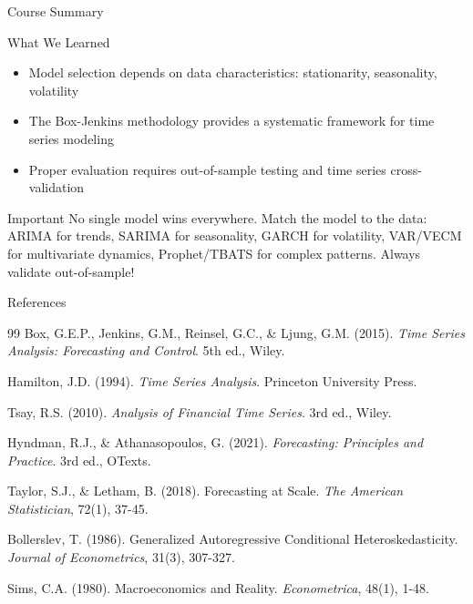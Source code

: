 \documentclass[9pt, aspectratio=169, t]{beamer}
\begin{document}
\begin{frame}{Course Summary}
\begin{block}{What We Learned}
\begin{itemize}
    \item Model selection depends on data characteristics: stationarity, seasonality, volatility
    \item The Box-Jenkins methodology provides a systematic framework for time series modeling
    \item Proper evaluation requires out-of-sample testing and time series cross-validation
\end{itemize}
\end{block}

\begin{alertblock}{Important}
No single model wins everywhere. Match the model to the data: ARIMA for trends, SARIMA for seasonality, GARCH for volatility, VAR/VECM for multivariate dynamics, Prophet/TBATS for complex patterns. Always validate out-of-sample!
\end{alertblock}
\end{frame}

\begin{frame}{References}
    \footnotesize
    \begin{thebibliography}{99}
         Box, G.E.P., Jenkins, G.M., Reinsel, G.C., \& Ljung, G.M. (2015). \textit{Time Series Analysis: Forecasting and Control}. 5th ed., Wiley.

         Hamilton, J.D. (1994). \textit{Time Series Analysis}. Princeton University Press.

         Tsay, R.S. (2010). \textit{Analysis of Financial Time Series}. 3rd ed., Wiley.

         Hyndman, R.J., \& Athanasopoulos, G. (2021). \textit{Forecasting: Principles and Practice}. 3rd ed., OTexts.

         Taylor, S.J., \& Letham, B. (2018). Forecasting at Scale. \textit{The American Statistician}, 72(1), 37-45.

         Bollerslev, T. (1986). Generalized Autoregressive Conditional Heteroskedasticity. \textit{Journal of Econometrics}, 31(3), 307-327.

         Sims, C.A. (1980). Macroeconomics and Reality. \textit{Econometrica}, 48(1), 1-48.
    \end{thebibliography}
\end{frame}
\end{document}
